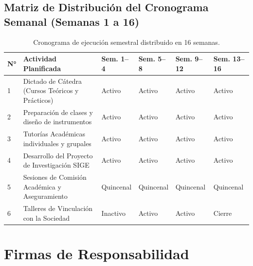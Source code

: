 \documentclass[12pt,a4paper]{article}
\begin{document}
\subsection{Matriz de Distribución del Cronograma Semanal (Semanas 1 a 16)}
\begin{table}[H]
\centering
\footnotesize
\renewcommand{\arraystretch}{1.15}
\begin{tabularx}{\textwidth}{|>{\hsize=0.3\hsize\centering\arraybackslash\footnotesize}X|>{\hsize=1.7\hsize\raggedright\arraybackslash\footnotesize}X|>{\hsize=0.5\hsize\centering\arraybackslash\footnotesize}X|>{\hsize=0.5\hsize\centering\arraybackslash\footnotesize}X|>{\hsize=0.5\hsize\centering\arraybackslash\footnotesize}X|>{\hsize=0.5\hsize\centering\arraybackslash\footnotesize}X|}
\hline
\rowcolor{tableheader}
\textbf{N°} & \textbf{Actividad Planificada} & \textbf{Sem. 1--4} & \textbf{Sem. 5--8} & \textbf{Sem. 9--12} & \textbf{Sem. 13--16} \\
\hline
1 & Dictado de Cátedra (Cursos Teóricos y Prácticos) & Activo & Activo & Activo & Activo \\
\hline
2 & Preparación de clases y diseño de instrumentos & Activo & Activo & Activo & Activo \\
\hline
3 & Tutorías Académicas individuales y grupales & Activo & Activo & Activo & Activo \\
\hline
4 & Desarrollo del Proyecto de Investigación SIGE & Activo & Activo & Activo & Activo \\
\hline
5 & Sesiones de Comisión Académica y Aseguramiento & Quincenal & Quincenal & Quincenal & Quincenal \\
\hline
6 & Talleres de Vinculación con la Sociedad & Inactivo & Activo & Activo & Cierre \\
\hline
\end{tabularx}
\caption{Cronograma de ejecución semestral distribuido en 16 semanas.}
\end{table}

\section{Firmas de Responsabilidad}
\end{document}
